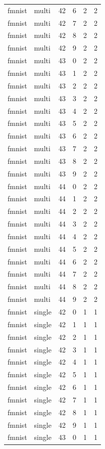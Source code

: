 \begin{tabular}{llrrrr}
fmnist & multi & 42 & 6 & 2 & 2 \\
fmnist & multi & 42 & 7 & 2 & 2 \\
fmnist & multi & 42 & 8 & 2 & 2 \\
fmnist & multi & 42 & 9 & 2 & 2 \\
fmnist & multi & 43 & 0 & 2 & 2 \\
fmnist & multi & 43 & 1 & 2 & 2 \\
fmnist & multi & 43 & 2 & 2 & 2 \\
fmnist & multi & 43 & 3 & 2 & 2 \\
fmnist & multi & 43 & 4 & 2 & 2 \\
fmnist & multi & 43 & 5 & 2 & 2 \\
fmnist & multi & 43 & 6 & 2 & 2 \\
fmnist & multi & 43 & 7 & 2 & 2 \\
fmnist & multi & 43 & 8 & 2 & 2 \\
fmnist & multi & 43 & 9 & 2 & 2 \\
fmnist & multi & 44 & 0 & 2 & 2 \\
fmnist & multi & 44 & 1 & 2 & 2 \\
fmnist & multi & 44 & 2 & 2 & 2 \\
fmnist & multi & 44 & 3 & 2 & 2 \\
fmnist & multi & 44 & 4 & 2 & 2 \\
fmnist & multi & 44 & 5 & 2 & 2 \\
fmnist & multi & 44 & 6 & 2 & 2 \\
fmnist & multi & 44 & 7 & 2 & 2 \\
fmnist & multi & 44 & 8 & 2 & 2 \\
fmnist & multi & 44 & 9 & 2 & 2 \\
fmnist & single & 42 & 0 & 1 & 1 \\
fmnist & single & 42 & 1 & 1 & 1 \\
fmnist & single & 42 & 2 & 1 & 1 \\
fmnist & single & 42 & 3 & 1 & 1 \\
fmnist & single & 42 & 4 & 1 & 1 \\
fmnist & single & 42 & 5 & 1 & 1 \\
fmnist & single & 42 & 6 & 1 & 1 \\
fmnist & single & 42 & 7 & 1 & 1 \\
fmnist & single & 42 & 8 & 1 & 1 \\
fmnist & single & 42 & 9 & 1 & 1 \\
fmnist & single & 43 & 0 & 1 & 1 \\

\end{tabular}
